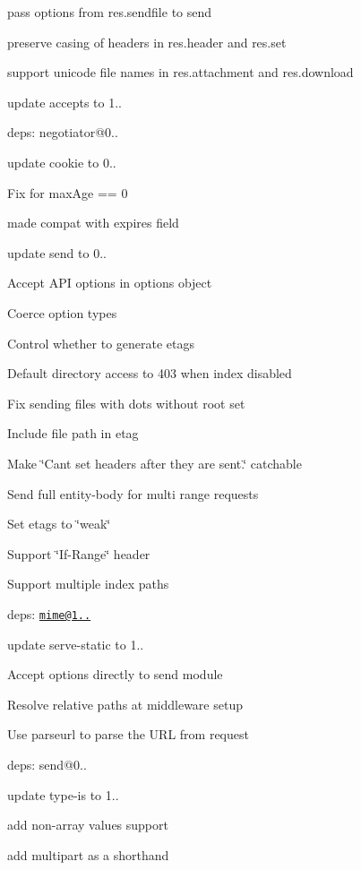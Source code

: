 {\ttfamily 
\begin{DoxyItemize}
\item pass options from {\ttfamily res.\+sendfile} to {\ttfamily send}
\item preserve casing of headers in {\ttfamily res.\+header} and {\ttfamily res.\+set}
\item support unicode file names in {\ttfamily res.\+attachment} and {\ttfamily res.\+download}
\item update accepts to 1..
\begin{DoxyItemize}
\item deps\+: negotiator@0..
\end{DoxyItemize}
\item update cookie to 0..
\begin{DoxyItemize}
\item Fix for max\+Age == 0
\item made compat with expires field
\end{DoxyItemize}
\item update send to 0..
\begin{DoxyItemize}
\item Accept A\+PI options in options object
\item Coerce option types
\item Control whether to generate etags
\item Default directory access to 403 when index disabled
\item Fix sending files with dots without root set
\item Include file path in etag
\item Make \char`\"{}\+Can\textquotesingle{}t set headers after they are sent.\char`\"{} catchable
\item Send full entity-\/body for multi range requests
\item Set etags to \char`\"{}weak\char`\"{}
\item Support \char`\"{}\+If-\/\+Range\char`\"{} header
\item Support multiple index paths
\item deps\+: \href{mailto:mime@1.2.11}{\tt mime@1..}
\end{DoxyItemize}
\item update serve-\/static to 1..
\begin{DoxyItemize}
\item Accept options directly to {\ttfamily send} module
\item Resolve relative paths at middleware setup
\item Use parseurl to parse the U\+RL from request
\item deps\+: send@0..
\end{DoxyItemize}
\item update type-\/is to 1..
\begin{DoxyItemize}
\item add non-\/array values support
\item add {\ttfamily multipart} as a shorthand
\end{DoxyItemize}
\end{DoxyItemize}}

